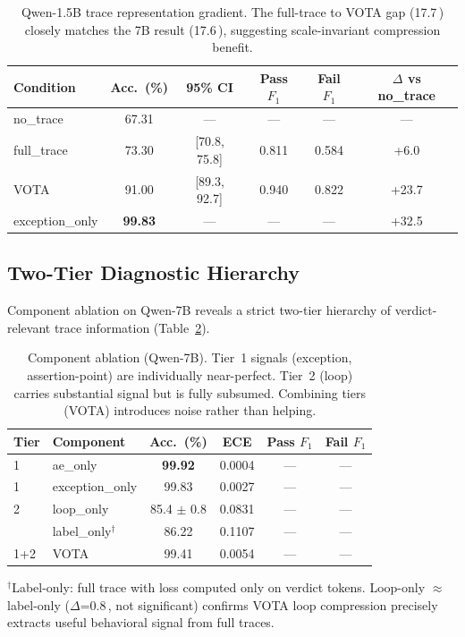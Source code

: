 \documentclass[11pt]{article}
\newcommand{\best}[1]{\textbf{\textcolor{bestcolor}{#1}}}
\newcommand{\pp}{\,\text{pp}}
\begin{document}
\begin{table}[t]
\centering
\small
\caption{Qwen-1.5B trace representation gradient. The full-trace to VOTA gap (17.7\pp) closely matches the 7B result (17.6\pp), suggesting scale-invariant compression benefit.}
\label{tab:density_15b}
\begin{tabular}{@{}lccccc@{}}
\toprule
\textbf{Condition} & \textbf{Acc.\ (\%)} & \textbf{95\% CI} & \textbf{Pass $F_1$} & \textbf{Fail $F_1$} & \textbf{$\Delta$ vs no\_trace} \\
\midrule
no\_trace        & 67.31 & --- & --- & --- & --- \\
full\_trace      & 73.30 & [70.8, 75.8] & 0.811 & 0.584 & +6.0 \\
VOTA             & 91.00 & [89.3, 92.7] & 0.940 & 0.822 & +23.7 \\
exception\_only  & \best{99.83} & --- & --- & --- & +32.5 \\
\bottomrule
\end{tabular}
\end{table}


\subsection{Two-Tier Diagnostic Hierarchy}
\label{sec:hierarchy}

Component ablation on Qwen-7B reveals a strict two-tier hierarchy of verdict-relevant trace information (Table~\ref{tab:tiers}).

\begin{table}[t]
\centering
\small
\caption{Component ablation (Qwen-7B). Tier~1 signals (exception, assertion-point) are individually near-perfect. Tier~2 (loop) carries substantial signal but is fully subsumed. Combining tiers (VOTA) introduces noise rather than helping.}
\label{tab:tiers}
\begin{tabular}{@{}llcccc@{}}
\toprule
\textbf{Tier} & \textbf{Component} & \textbf{Acc.\ (\%)} & \textbf{ECE} & \textbf{Pass $F_1$} & \textbf{Fail $F_1$} \\
\midrule
1 & ae\_only        & \best{99.92} & 0.0004 & --- & --- \\
1 & exception\_only & 99.83 & 0.0027 & --- & --- \\
\midrule
2 & loop\_only      & 85.4 $\pm$ 0.8 & 0.0831 & --- & --- \\
  & label\_only$^\dagger$ & 86.22 & 0.1107 & --- & --- \\
\midrule
1+2 & VOTA          & 99.41 & 0.0054 & --- & --- \\
\bottomrule
\end{tabular}
\vspace{2pt}
\begin{flushleft}
\footnotesize
$^\dagger$Label-only: full trace with loss computed only on verdict tokens. Loop-only $\approx$ label-only ($\Delta$=0.8\pp, not significant) confirms VOTA loop compression precisely extracts useful behavioral signal from full traces.
\end{flushleft}
\end{table}
\end{document}

